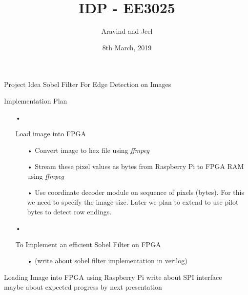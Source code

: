 \documentclass[11pt]{beamer}
\author{Aravind and Jeel}
\title{IDP - EE3025}
\institute{IIT Hyderabad}
\date{8th March, 2019}
\begin{document}
\begin{frame}
\titlepage
\end{frame}

\begin{frame}{Project Idea}
	\textsf{Sobel Filter For Edge Detection on Images}
\end{frame}

\begin{frame}{Implementation Plan}
	\begin{itemize}
		\item[•] {Load image into FPGA
			\begin{itemize}
				\item[•] Convert image to hex file using \textit{ffmpeg}
				\item[•] Stream these pixel values as bytes from Raspberry Pi to FPGA RAM using \textit{ffmpeg}
				\item[•] Use coordinate decoder module on sequence of pixels (bytes). For this we need to specify the image size. Later we plan to extend to use pilot bytes to detect row endings. 
			\end{itemize}
		}
		\pause
		\item[•] { To Implement an efficient Sobel Filter on FPGA
			\begin{itemize}
				\item[•] (write about sobel filter implementation in verilog)
			\end{itemize}
		}
	\end{itemize}

\end{frame}

\begin{frame}{Loading Image into FPGA using Raspberry Pi}
write about SPI interface \\
maybe about expected progress by next presentation
\end{frame}
\end{document}
